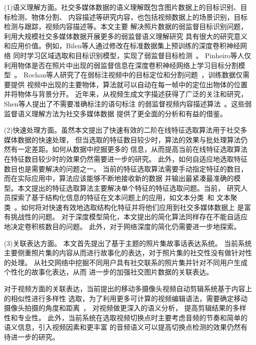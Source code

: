 (1)语义理解方面。社交多媒体数据的语义理解既包含图片数据上的目标识别、目标检测、物体分割、
内容描述等研究内容，也包括视频数据上的场景识别，目标检测与跟踪，视频内容描述等。本文主要
解决照片数据的弱监督目标识别问题，利用大规模社交多媒体数据开展更多的弱监督语义理解研究
具有很大的研究意义和应用价值。例如，Bilen等人通过修改在标准数据集上预训练的深度卷积神经网络
同时学习区域选取和目标识别模型，实现了弱监督目标检测~\cite{Bilen_2016_CVPR}。
Pinheiro等人仅利用物体是否在照片中出现的弱监督信息在深度卷积神经网络上学习目标分割模型~\cite{pinheiro2014weakly}。
Rochan等人研究了在弱标注视频中的目标定位和分割问题~\cite{rochan2016weakly}，训练数据仅需要提供
视频中出现的主要物体，算法就可以自动在每一帧中的定位出物体的位置并将物体与背景分开。
近年来，从视频生成文字描述获得了广泛的关注和研究，Shen等人提出了不需要准确标注的语句标注
的弱监督视频内容描述算法~\cite{shen2017weakly}。这些弱监督语义理解方法为社交多媒体数据
提供了更全面的分析和有益的借鉴。

(2)快速处理方面。虽然本文提出了快速有效的二阶在线特征选取算法用于社交多媒体数据的快速处理，
但当选取的特征数目较少时，算法的效果与批处理算法仍然有一定差距。如何从数据中挖掘更多的
信息，从而提高当前在线特征选取算法在特征数目较少时的效果仍然需要进一步的研究。
此外，如何自适应地选取特征数目也是需要解决的问题之一。
当前的特征选取算法需要手动指定特征的数目，而在实际应用中，算法应该能够不断地接收新的数据
并输出最紧凑最准确的模型。本文提出的特征选取算法主要解决单个特征的特征选取问题。当前，
研究人员探索了基于结构化信息的特征在文本问题上的应用，如文本分类~\cite{Wang2016TCH}和
文本聚类~\cite{Wang2015IWK}。如何将对快速有效地选取结构化特征并将他们应用到社交多媒体数据上
是富有挑战性的问题。
对于深度模型简化，本文提出的简化算法同样存在不能自适应地决定卷积核数目的问题。
此外，对于网络深度的简化仍需要进一步地探索。

(3)关联表达方面。
本文首先提出了基于主题的照片集故事话表达系统。
当前系统主要侧重照片集的内容从而进行故事化的表达，对于照片集的社交性没有做针对性的处理。
从社交网络中挖掘不同用户具有社交联系的照片集并针对不同用户生成个性化的故事化表达，从而
进一步的加强社交图片数据的关联表达。

对于视频方面的关联表达，当前提出的移动多摄像头视频自动剪辑系统基于内容上的相似性进行多样性
选取，为了利用更多可计算的视频编辑语法，需要确定移动摄像头拍摄的角度和距离~\cite{liu2012mm}，
对视频做更深入的语义分析， 提高剪辑结果的多样性和专业性。
此外，当前系统在选取视频切换点时主要考虑音频的节奏和简单的语义信息，引入视频因素和更丰富
的音频语义可以提高切换点检测的效果仍然有待进一步的研究。
